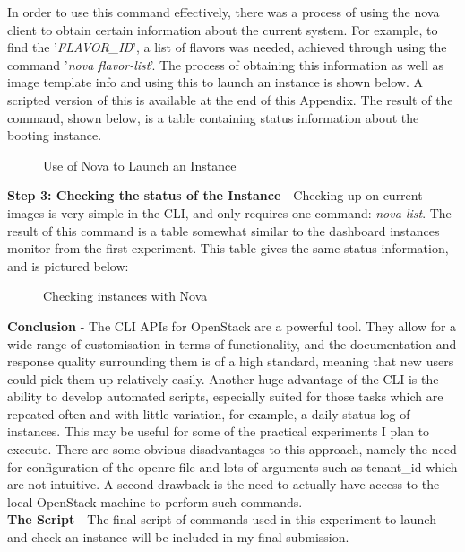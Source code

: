In order to use this command effectively, there was a process of using the nova client to obtain certain information about the current system. For example, to find the '\textit{FLAVOR\_ID}', a list of flavors was needed, achieved through using the command '\textit{nova flavor-list}'. The process of obtaining this information as well as image template info and using this to launch an instance is shown below. A scripted version of this is available at the end of this Appendix. The result of the command, shown below, is a table containing status information about the booting instance. 

\begin{figure}[H]
\centering
{}
\caption{Use of Nova to Launch an Instance}
\end{figure}

\textbf{Step 3: Checking the status of the Instance} - Checking up on current images is very simple in the CLI, and only requires one command: \textit{nova list}. The result of this command is a table somewhat similar to the dashboard instances monitor from the first experiment. This table gives the same status information, and is pictured below:
\begin{figure}[H]
\centering
{}
\caption{Checking instances with Nova}
\end{figure}

\textbf{Conclusion} - The CLI APIs for OpenStack are a powerful tool. They allow for a wide range of customisation in terms of functionality, and the documentation and response quality surrounding them is of a high standard, meaning that new users could pick them up relatively easily. Another huge advantage of the CLI is the ability to develop automated scripts, especially suited for those tasks which are repeated often and with little variation, for example, a daily status log of instances. This may be useful for some of the practical experiments I plan to execute. There are some obvious disadvantages to this approach, namely the need for configuration of the openrc file and lots of arguments such as tenant\_id which are not intuitive. A second drawback is the need to actually have access to the local OpenStack machine to perform such commands. \\

\textbf{The Script} - The final script of commands used in this experiment to launch and check an instance will be included in my final submission. \\

